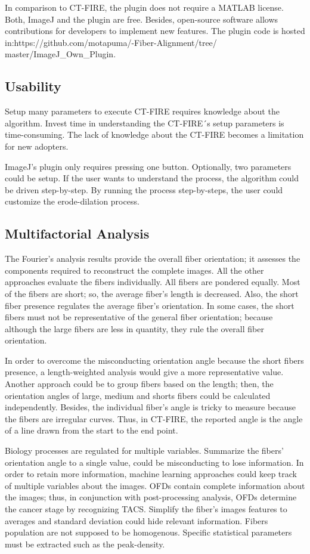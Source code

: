 \documentclass[12pt,a4paper]{article}
\begin{document}
In comparison to CT-FIRE, the plugin does not require a MATLAB license. Both, ImageJ and the plugin are free. Besides, open-source software allows contributions for developers to implement new features. The plugin code is hosted in:https://github.com/motapuma/-Fiber-Alignment/tree/ master/ImageJ\_Own\_Plugin.
\subsection{Usability}
Setup many parameters to execute CT-FIRE requires knowledge about the algorithm. Invest time in understanding the CT-FIRE´s setup parameters is time-consuming. The lack of knowledge about the CT-FIRE becomes a limitation for new adopters. 

ImageJ's plugin only requires pressing one button. Optionally, two parameters could be setup. If the user wants to understand the process, the algorithm could be driven step-by-step. By running the process step-by-steps, the user could customize the erode-dilation process.
\subsection{Multifactorial Analysis}

The Fourier's analysis results provide the overall fiber orientation; it assesses the components required to reconstruct the complete images. All the other approaches evaluate the fibers individually. All fibers are pondered equally. Most of the fibers are short; so, the average fiber's length is decreased. Also, the short fiber presence regulates the average fiber's orientation. In some cases, the short fibers must not be representative of the general fiber orientation; because although the large fibers are less in quantity, they rule the overall fiber orientation.

In order to overcome the misconducting orientation angle because the short fibers presence, a length-weighted analysis would give a more representative value. Another approach could be to group fibers based on the length; then, the orientation angles of large, medium and shorts fibers could be calculated independently. Besides, the individual fiber's angle is tricky to measure because the fibers are irregular curves. Thus, in CT-FIRE, the reported angle is the angle of a line drawn from the start to the end point.
 
Biology processes are regulated for multiple variables. Summarize the fibers' orientation angle to a single value, could be misconducting to lose information. In order to retain more information, machine learning approaches could keep track of multiple variables about the images. OFDs contain complete information about the images; thus, in conjunction with post-processing analysis, OFDs determine the cancer stage by recognizing TACS. Simplify the fiber's images features to averages and standard deviation could hide relevant information. Fibers population are not supposed to be homogenous. Specific statistical parameters must be extracted such as the peak-density. 
\end{document}
